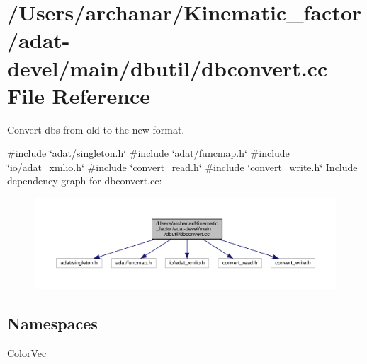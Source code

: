 \hypertarget{adat-devel_2main_2dbutil_2dbconvert_8cc}{}\section{/\+Users/archanar/\+Kinematic\+\_\+factor/adat-\/devel/main/dbutil/dbconvert.cc File Reference}
\label{adat-devel_2main_2dbutil_2dbconvert_8cc}


Convert dbs from old to the new format.  


{\ttfamily \#include \char`\"{}adat/singleton.\+h\char`\"{}}\newline
{\ttfamily \#include \char`\"{}adat/funcmap.\+h\char`\"{}}\newline
{\ttfamily \#include \char`\"{}io/adat\+\_\+xmlio.\+h\char`\"{}}\newline
{\ttfamily \#include \char`\"{}convert\+\_\+read.\+h\char`\"{}}\newline
{\ttfamily \#include \char`\"{}convert\+\_\+write.\+h\char`\"{}}\newline
Include dependency graph for dbconvert.\+cc\+:
\nopagebreak
\begin{figure}[H]
\begin{center}
\leavevmode
\includegraphics[width=350pt]{d8/d07/adat-devel_2main_2dbutil_2dbconvert_8cc__incl}
\end{center}
\end{figure}
\subsection*{Namespaces}
\begin{DoxyCompactItemize}
\item 
 \mbox{\hyperlink{namespaceColorVec}{Color\+Vec}}
\end{DoxyCompactItemize}
